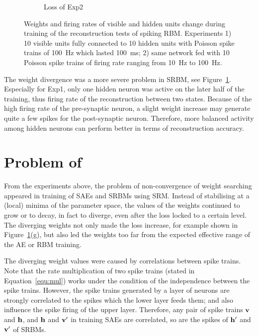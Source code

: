 \begin{figure}
\begin{subfigure}[t]{0.45\textwidth}
		\caption{Loss of Exp2}
	\end{subfigure}
	\caption{Weights and firing rates of visible and hidden units change during training of the reconstruction tests of \protect{} spiking RBM. 
		Experiments 1) 10 visible units fully connected to 10 hidden units with Poisson spike trains of 100~Hz which lasted 100~ms; 2) \protect{} same network fed with 10 Poisson spike trains of firing rate ranging from 10~Hz to 100~Hz.}
\label{fig:srbm_orig}
\end{figure}

The weight divergence was a more severe problem in \protect{} SRBM, see Figure~\ref{fig:srbm_orig}.
Especially for Exp1, only one hidden neuron was active on the later half of the training, thus \protect{} \protect{} firing rate of the reconstruction \protect{} \protect{} between two states.
Because of the high firing rate of the pre-synaptic neuron, a slight weight increase may generate quite a few spikes for the post-synaptic neuron.
Therefore, more balanced activity among hidden neurons can perform better in terms of reconstruction accuracy.

\section[Problem of  Spike Correlations	]{Problem of \protect{} \protect{}}
\label{sec:problem}
From the experiments above, the problem of non-convergence of weight searching appeared in training of SAEs and SRBMs using SRM.
Instead of stabilising at a (local) minima of the parameter space, the values of the weights continued to grow or to decay, in fact to diverge, even after the loss locked to a certain level.
The diverging weights not only made the loss increase, for example \protect{} shown in Figure~\ref{fig:srbm_orig}(g), but also led the weights too far from the expected effective range of the AE or RBM training.

The diverging weight values were caused by \protect{} correlations between spike trains.
Note that the rate multiplication of two spike trains (stated in Equation~\ref{equ:mul}) works under the condition of the independence between the spike trains.
However, the spike trains generated by a layer of neurons are strongly correlated to the spikes which the lower layer feeds them; and also influence the spike firing of the upper layer.
Therefore, any pair of spike trains $\bf{v}$ and $\bf{h}$, and $\bf{h}$ and $\bf{v'}$ in training SAEs are correlated, so are the spikes of $\bf{h'}$ and $\bf{v'}$ of SRBMs.



